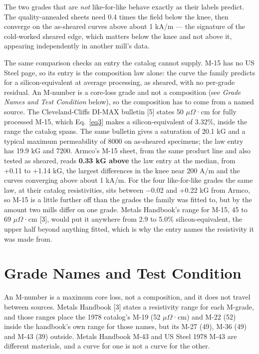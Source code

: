 \documentclass[
  11pt,
]{article}
\begin{document}
The two grades that are \emph{not} like-for-like behave exactly as their labels predict. The quality-annealed sheets need 0.4 times the field below the knee, then converge on the as-sheared curves above about 1 kA/m --- the signature of the cold-worked sheared edge, which matters below the knee and not above it, appearing independently in another mill's data.

The same comparison checks an entry the catalog cannot supply. M-15 has no US Steel page, so its entry is the composition law alone: the curve the family predicts for a silicon-equivalent at average processing, as sheared, with no per-grade residual. An M-number is a core-loss grade and not a composition (see \emph{Grade Names and Test Condition} below), so the composition has to come from a named source. The Cleveland-Cliffs DI-MAX bulletin {[}5{]} states 50 \(\mu\Omega\)·cm for fully processed M-15, which Eq.~\eqref{eq3} makes a silicon-equivalent of 3.32\%, inside the range the catalog spans. The same bulletin gives a saturation of 20.1 kG and a typical maximum permeability of 8000 on as-sheared specimens; the law entry has 19.9 kG and 7200. Armco's M-15 sheet, from the same product line and also tested as sheared, reads \textbf{0.33 kG above} the law entry at the median, from +0.11 to +1.14 kG, the largest differences in the knee near 200 A/m and the curves converging above about 1 kA/m. For the four like-for-like grades the same law, at their catalog resistivities, sits between \(-\)0.02 and +0.22 kG from Armco, so M-15 is a little further off than the grades the family was fitted to, but by the amount two mills differ on one grade. Metals Handbook's range for M-15, 45 to 69 \(\mu\Omega\)·cm {[}3{]}, would put it anywhere from 2.9 to 5.0\% silicon-equivalent, the upper half beyond anything fitted, which is why the entry names the resistivity it was made from.

\section{Grade Names and Test Condition}\label{grade-names-and-test-condition}

An M-number is a maximum core loss, not a composition, and it does not travel between sources. Metals Handbook {[}3{]} states a resistivity range for each M-grade, and those ranges place the 1978 catalog's M-19 (52 \(\mu\Omega\)·cm) and M-22 (52) inside the handbook's own range for those names, but its M-27 (49), M-36 (49) and M-43 (39) outside. Metals Handbook M-43 and US Steel 1978 M-43 are different materials, and a curve for one is not a curve for the other.
\end{document}
